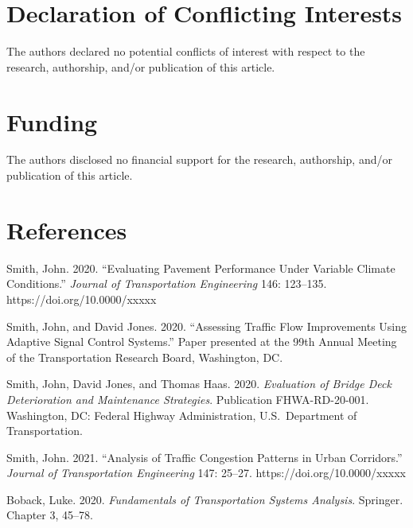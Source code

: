\documentclass[12pt,letterpaper]{article}
\newcommand{\refitem}[1]{\par\noindent\hangindent=0.5in\hangafter=1 #1\par\vspace{6pt}}
\begin{document}
\section{Declaration of Conflicting Interests}
The authors declared no potential conflicts of interest with respect to the research,
authorship, and/or publication of this article.

\section{Funding}
The authors disclosed no financial support for the research, authorship, and/or
publication of this article.

\section{References}
\refitem{Smith, John. 2020. ``Evaluating Pavement Performance Under Variable Climate
Conditions.'' \textit{Journal of Transportation Engineering} 146: 123--135.
https://doi.org/10.0000/xxxxx}

\refitem{Smith, John, and David Jones. 2020. ``Assessing Traffic Flow Improvements Using
Adaptive Signal Control Systems.'' Paper presented at the 99th Annual Meeting of the
Transportation Research Board, Washington, DC.}

\refitem{Smith, John, David Jones, and Thomas Haas. 2020. \textit{Evaluation of Bridge
Deck Deterioration and Maintenance Strategies}. Publication FHWA-RD-20-001. Washington,
DC: Federal Highway Administration, U.S.\ Department of Transportation.}

\refitem{Smith, John. 2021. ``Analysis of Traffic Congestion Patterns in Urban
Corridors.'' \textit{Journal of Transportation Engineering} 147: 25--27.
https://doi.org/10.0000/xxxxx}

\refitem{Boback, Luke. 2020. \textit{Fundamentals of Transportation Systems Analysis}.
Springer. Chapter 3, 45--78.}
\end{document}
